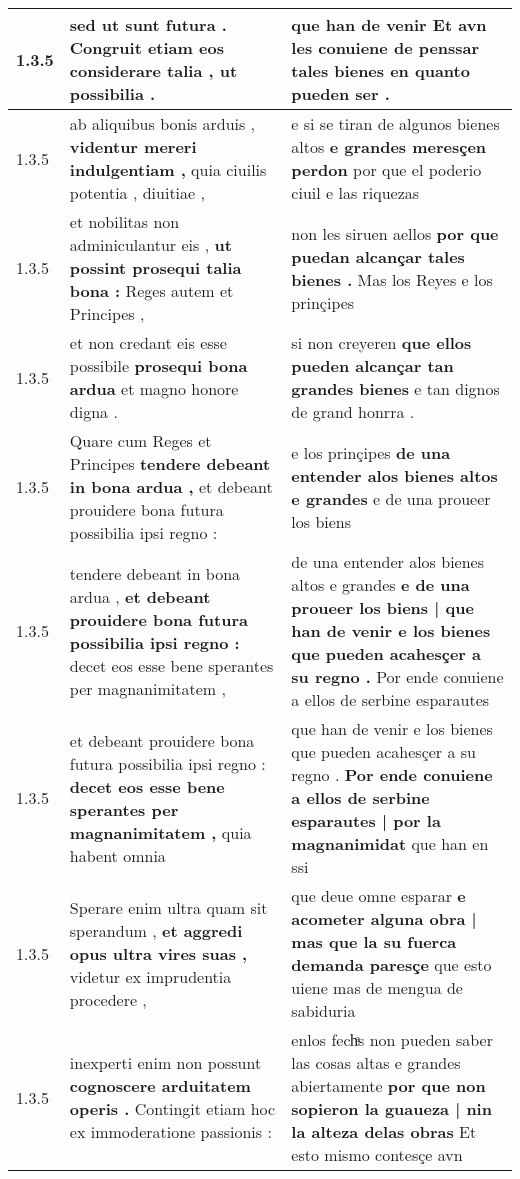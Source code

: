 \begin{tabular}{|p{1cm}|p{6.5cm}|p{6.5cm}|}
1.3.5 & sed ut sunt futura . \textbf{ Congruit etiam eos considerare talia , } ut possibilia . & que han de venir \textbf{ Et avn les conuiene de penssar tales bienes } en quanto pueden ser . \\\hline
1.3.5 & ab aliquibus bonis arduis , \textbf{ videntur mereri indulgentiam , } quia ciuilis potentia , diuitiae , & e si se tiran de algunos bienes altos \textbf{ e grandes meresçen perdon } por que el poderio ciuil e las riquezas \\\hline
1.3.5 & et nobilitas non adminiculantur eis , \textbf{ ut possint prosequi talia bona : } Reges autem et Principes , & non les siruen aellos \textbf{ por que puedan alcançar tales bienes . } Mas los Reyes e los prinçipes \\\hline
1.3.5 & et non credant eis esse possibile \textbf{ prosequi bona ardua } et magno honore digna . & si non creyeren \textbf{ que ellos pueden alcançar tan grandes bienes } e tan dignos de grand honrra . \\\hline
1.3.5 & Quare cum Reges et Principes \textbf{ tendere debeant in bona ardua , } et debeant prouidere bona futura possibilia ipsi regno : & e los prinçipes \textbf{ de una entender alos bienes altos e grandes } e de una proueer los biens \\\hline
1.3.5 & tendere debeant in bona ardua , \textbf{ et debeant prouidere bona futura possibilia ipsi regno : } decet eos esse bene sperantes per magnanimitatem , & de una entender alos bienes altos e grandes \textbf{ e de una proueer los biens | que han de venir e los bienes que pueden acahesçer a su regno . } Por ende conuiene a ellos de serbine esparautes \\\hline
1.3.5 & et debeant prouidere bona futura possibilia ipsi regno : \textbf{ decet eos esse bene sperantes per magnanimitatem , } quia habent omnia & que han de venir e los bienes que pueden acahesçer a su regno . \textbf{ Por ende conuiene a ellos de serbine esparautes | por la magnanimidat } que han en ssi \\\hline
1.3.5 & Sperare enim ultra quam sit sperandum , \textbf{ et aggredi opus ultra vires suas , } videtur ex imprudentia procedere , & que deue omne esparar \textbf{ e acometer alguna obra | mas que la su fuerca demanda paresçe } que esto uiene mas de mengua de sabiduria \\\hline
1.3.5 & inexperti enim non possunt \textbf{ cognoscere arduitatem operis . } Contingit etiam hoc ex immoderatione passionis : & enlos fechͣs non pueden saber las cosas altas e grandes abiertamente \textbf{ por que non sopieron la guaueza | nin la alteza delas obras } Et esto mismo contesçe avn \\\hline

\end{tabular}
